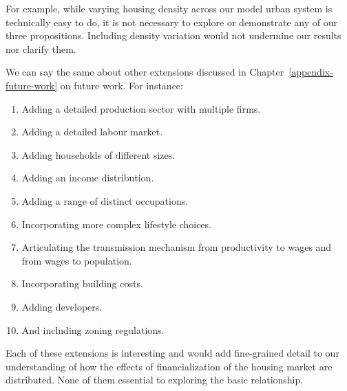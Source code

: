 For example, %
while varying housing density across our model urban system is technically easy to do, it is not necessary to explore or demonstrate any of our three propositions. Including density variation would not undermine our results nor clarify them. %

We can say the same about other extensions discussed in Chapter~\ref{appendix-future-work} on future work. For instance: 
\begin{enumerate}
    \item Adding a detailed production sector with multiple firms. 
    \item Adding a detailed labour market.
    \item Adding households of different sizes.
    \item Adding an income distribution. 
    \item Adding a range of distinct occupations.
    \item Incorporating more complex lifestyle choices.
    \item Articulating the transmission mechanism from productivity to wages and from wages to population. 
    \item Incorporating building costs. 
    \item Adding developers.
    \item And including zoning regulations.
\end{enumerate}

Each of these extensions is interesting and would add fine-grained detail to our understanding of how the effects of financialization of the housing market are distributed. None of them essential to exploring the basic relationship. %

